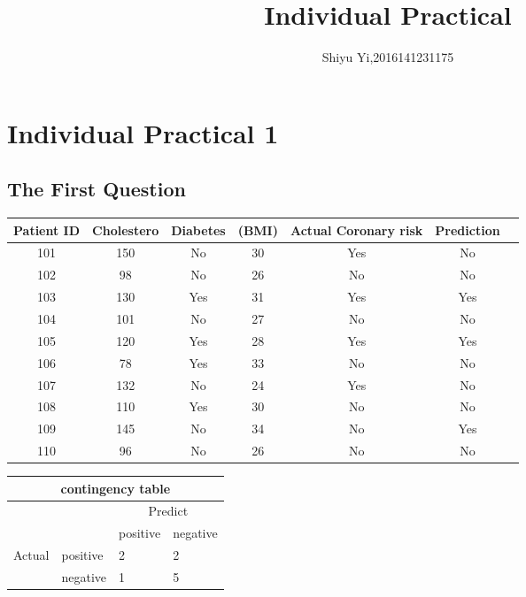 \documentclass[a4pper,11pt,onecolumn]{article}
\title{Individual Practical }
\author[*]{Shiyu Yi,2016141231175}
\begin{document}
\maketitle


\section{Individual Practical 1}
\subsection{The First Question}

\begin{table}[h]  %
	\centering  %
	
	\begin{tabular}{ccccccc}  
		\hline
		\hline
		Patient
		ID& Cholestero & Diabetes  & 
		(BMI)& Actual
		Coronary
		risk&Prediction\\ [0.5ex]  %
		\hline
		101 & 150  & No  &  30  &Yes&No \\
		102 & 98 & No  & 26 &No&No \\
		103 & 130  & Yes  & 31 &Yes&Yes \\
		104 & 101 & No & 27 &No&No \\
		105 & 120 & Yes & 28  & Yes&Yes\\
		106 & 78 & Yes & 33  &No&No \\
		107 & 132 & No & 24 &Yes &No\\
		108 & 110 & Yes & 30  &No&No \\
		109 & 145 & No  & 34  &No&Yes \\
		110 & 96 & No  & 26 &No&No\\
		\hline
	
		\hline
	\end{tabular}
\end{table}

\begin{tabular}{ |p{3cm}|p{3cm}|p{3cm}|p{3cm}|  }
	\hline
	\multicolumn{4}{|c|}{contingency table} \\
	\hline	
	 \multicolumn{2}{|c|}{}& \multicolumn{2}{|c|}{Predict}\\
	\cline{1-2}\cline{3-4}

	&  &positive &negative\\
	\hline
	\multirow{2}{*}{Actual}
	& positive &2&2 \\
	\hline
	 & negative   & 1&5 \\

	\hline
\end{tabular}
\end{document}
